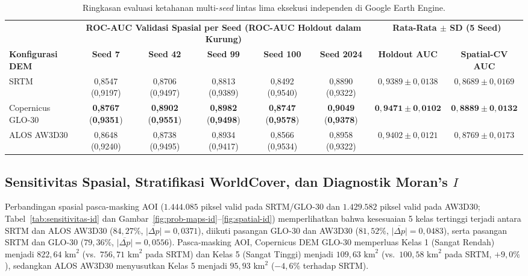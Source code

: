 \documentclass[11pt,twoside]{article}
\begin{document}
\begin{table}[!htbp]
\small
\centering
\caption{Ringkasan evaluasi ketahanan multi-\textit{seed} lintas lima eksekusi independen di Google Earth Engine.}
\label{tab:multiseed-id}
\begin{adjustbox}{max width=\textwidth}
\begin{tabular}{l ccccc c c}
\toprule
& \multicolumn{5}{c}{\textbf{ROC-AUC Validasi Spasial per Seed (ROC-AUC Holdout dalam Kurung)}} & \multicolumn{2}{c}{\textbf{Rata-Rata $\pm$ SD (5 Seed)}} \\
\cmidrule(lr){2-6} \cmidrule(lr){7-8}
\textbf{Konfigurasi DEM} & \textbf{Seed 7} & \textbf{Seed 42} & \textbf{Seed 99} & \textbf{Seed 100} & \textbf{Seed 2024} & \textbf{Holdout AUC} & \textbf{Spatial-CV AUC} \\
\midrule
SRTM & 0,8547 (0,9197) & 0,8706 (0,9497) & 0,8813 (0,9389) & 0,8492 (0,9540) & 0,8890 (0,9322) & $0{,}9389 \pm 0{,}0138$ & $0{,}8689 \pm 0{,}0169$ \\
Copernicus GLO-30 & \textbf{0,8767} (\textbf{0,9351}) & \textbf{0,8902} (\textbf{0,9551}) & \textbf{0,8982} (\textbf{0,9498}) & \textbf{0,8747} (\textbf{0,9578}) & \textbf{0,9049} (\textbf{0,9378}) & $\mathbf{0{,}9471 \pm 0{,}0102}$ & $\mathbf{0{,}8889 \pm 0{,}0132}$ \\
ALOS AW3D30 & 0,8648 (0,9240) & 0,8738 (0,9495) & 0,8934 (0,9417) & 0,8566 (0,9534) & 0,8958 (0,9322) & $0{,}9402 \pm 0{,}0121$ & $0{,}8769 \pm 0{,}0173$ \\
\bottomrule
\end{tabular}
\end{adjustbox}
\end{table}

\subsection{Sensitivitas Spasial, Stratifikasi WorldCover, dan Diagnostik Moran's $I$}\label{subsec:spasial-worldcover-id}

Perbandingan spasial pasca-masking AOI ($1.444.085$ piksel valid pada SRTM/GLO-30 dan $1.429.582$ piksel valid pada AW3D30; Tabel~\ref{tab:sensitivitas-id} dan Gambar~\ref{fig:prob-maps-id}--\ref{fig:spatial-id}) memperlihatkan bahwa kesesuaian 5 kelas tertinggi terjadi antara SRTM dan ALOS AW3D30 ($84{,}27\%$, $\overline{|\Delta p|} = 0{,}0371$), diikuti pasangan GLO-30 dan AW3D30 ($81{,}52\%$, $\overline{|\Delta p|} = 0{,}0483$), serta pasangan SRTM dan GLO-30 ($79{,}36\%$, $\overline{|\Delta p|} = 0{,}0556$). Pasca-masking AOI, Copernicus DEM GLO-30 memperluas Kelas 1 (Sangat Rendah) menjadi $822{,}64\text{ km}^2$ (vs.\ $756{,}71\text{ km}^2$ pada SRTM) dan Kelas 5 (Sangat Tinggi) menjadi $109{,}63\text{ km}^2$ (vs.\ $100{,}58\text{ km}^2$ pada SRTM, $+9{,}0\%$), sedangkan ALOS AW3D30 menyusutkan Kelas 5 menjadi $95{,}93\text{ km}^2$ ($-4{,}6\%$ terhadap SRTM).
\end{document}
